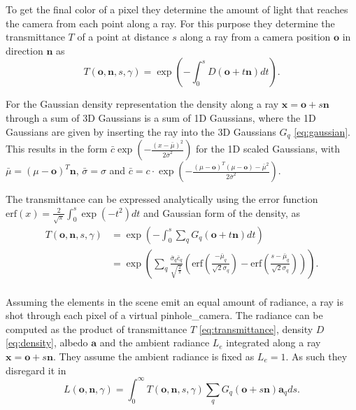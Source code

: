 \documentclass[a4paper, 11pt]{memoir}
\newcommand*{\erf}{\text{erf}}
\begin{document}
    To get the final color of a pixel they determine the amount of light that reaches the camera from each point
    along a ray. For this purpose they determine the \gls{transmittance} $T$ of a point at distance $s$ along a ray from
    a camera position $\mathbf{o}$ in direction $\mathbf{n}$ as
    \begin{equation}
        T(\mathbf{o}, \mathbf{n}, s, \gamma) = \exp{\left( - \int_0^s D(\mathbf{o} + t\mathbf{n}) dt \right)}.
        \label{eq:transmittance}
    \end{equation}

    For the Gaussian density representation the density along a ray $\mathbf{x} = \mathbf{o} + s\mathbf{n}$ through a
    sum of 3D Gaussians is a sum of 1D Gaussians, where the 1D Gaussians are given by inserting the ray into the
    3D Gaussians $G_q$ \eqref{eq:gaussian}. This results in the form
    $\bar{c} \exp{\left( - \frac{(x - \bar{\mu})^2}{2\bar{\sigma}^2} \right)}$ for the 1D scaled Gaussians, with
    $\bar{\mu} = (\mu - \mathbf{o})^T\mathbf{n}$, $\bar{\sigma} = \sigma$ and
    $\bar{c} = c \cdot \exp{\left( - \frac{(\mu - \mathbf{o})^T(\mu - \mathbf{o}) - \bar{\mu}^2}{2\bar{\sigma}^2} \right)}$.

    The \gls{transmittance} can be expressed analytically using the error function
    $\erf{(x)} = \frac{2}{\sqrt{\pi}}\int_0^s \exp{(-t^2)} dt$ and Gaussian form of the density, as
    \begin{equation}
        \begin{aligned}
            T(\mathbf{o}, \mathbf{n}, s, \gamma) &= \exp{\left( -\int_0^s
                \sum_q G_q(\mathbf{o} + t\mathbf{n} ) dt \right)}\\
            &= \exp{\left( \sum_q \frac{\bar{\sigma}_q \bar{c}_q}{\sqrt{\frac{2}{\pi}}}
            \left( \erf{\left( \frac{-\bar{\mu}_q}{\sqrt{2}\bar{\sigma}_q} \right)}
            - \erf{\left( \frac{s - \bar{\mu}_q}{\sqrt{2}\bar{\sigma}_q} \right)} \right) \right)}.\\
        \end{aligned}
        \label{eq:transmittance_analytical}
    \end{equation}

    Assuming the elements in the scene emit an equal amount of \gls{radiance}, a ray is shot through each pixel of a virtual
    \gls{pinhole_camera}. The \gls{radiance} can be computed as the product of \gls{transmittance} $T$ \eqref{eq:transmittance},
    density $D$ \eqref{eq:density}, \gls{albedo} $\mathbf{a}$ and the ambient \gls{radiance} $L_e$ integrated along a ray
    $\mathbf{x} = \mathbf{o} + s\mathbf{n}$. They assume the ambient \gls{radiance} is fixed as $L_e = 1$. As such they
    disregard it in
    \begin{equation}
        L(\mathbf{o}, \mathbf{n}, \gamma) = \int_0^\infty T(\mathbf{o}, \mathbf{n}, s, \gamma)
            \sum_q G_q(\mathbf{o} + s\mathbf{n})\mathbf{a}_q ds.
    \end{equation}
    
\end{document}
